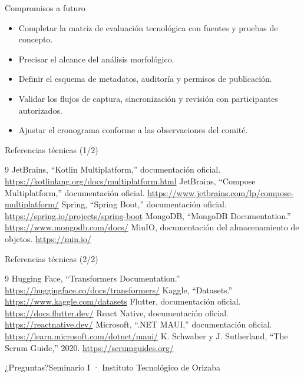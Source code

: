 \documentclass[aspectratio=169,10pt]{beamer}
\begin{document}
\begin{frame}{Compromisos a futuro}
\begin{itemize}\item Completar la matriz de evaluación tecnológica con fuentes y pruebas de concepto.\item Precisar el alcance del análisis morfológico.\item Definir el esquema de metadatos, auditoría y permisos de publicación.\item Validar los flujos de captura, sincronización y revisión con participantes autorizados.\item Ajustar el cronograma conforme a las observaciones del comité.\end{itemize}
\end{frame}
\begin{frame}{Referencias técnicas (1/2)}
\footnotesize\begin{thebibliography}{9} JetBrains, ``Kotlin Multiplatform,'' documentación oficial. \url{https://kotlinlang.org/docs/multiplatform.html} JetBrains, ``Compose Multiplatform,'' documentación oficial. \url{https://www.jetbrains.com/lp/compose-multiplatform/} Spring, ``Spring Boot,'' documentación oficial. \url{https://spring.io/projects/spring-boot} MongoDB, ``MongoDB Documentation.'' \url{https://www.mongodb.com/docs/} MinIO, documentación del almacenamiento de objetos. \url{https://min.io/}\end{thebibliography}
\end{frame}
\begin{frame}{Referencias técnicas (2/2)}
\footnotesize\begin{thebibliography}{9} Hugging Face, ``Transformers Documentation.'' \url{https://huggingface.co/docs/transformers/} Kaggle, ``Datasets.'' \url{https://www.kaggle.com/datasets} Flutter, documentación oficial. \url{https://docs.flutter.dev/} React Native, documentación oficial. \url{https://reactnative.dev/} Microsoft, ``.NET MAUI,'' documentación oficial. \url{https://learn.microsoft.com/dotnet/maui/} K. Schwaber y J. Sutherland, ``The Scrum Guide,'' 2020. \url{https://scrumguides.org/}\end{thebibliography}
\end{frame}
\begin{frame}[plain]\begin{center}\vspace{.5cm}\par{\Large\color{NahuaDark}¿Preguntas?}\vspace{1cm}\small\color{NahuaGray}Seminario I · Instituto Tecnológico de Orizaba\end{center}\end{frame}
\end{document}
